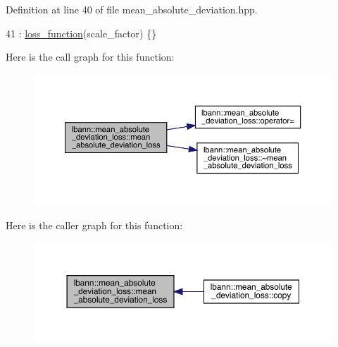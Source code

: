 Definition at line 40 of file mean\+\_\+absolute\+\_\+deviation.\+hpp.


\begin{DoxyCode}
41     : \hyperlink{classlbann_1_1loss__function_a0c5745e661c59e3e5496888d233c07cf}{loss\_function}(scale\_factor) \{\}
\end{DoxyCode}
Here is the call graph for this function\+:\nopagebreak
\begin{figure}[H]
\begin{center}
\leavevmode
\includegraphics[width=350pt]{classlbann_1_1mean__absolute__deviation__loss_ab729227237af711003b6cf4a9d9c9cf1_cgraph}
\end{center}
\end{figure}
Here is the caller graph for this function\+:\nopagebreak
\begin{figure}[H]
\begin{center}
\leavevmode
\includegraphics[width=350pt]{classlbann_1_1mean__absolute__deviation__loss_ab729227237af711003b6cf4a9d9c9cf1_icgraph}
\end{center}
\end{figure}
\mbox{\label{classlbann_1_1mean__absolute__deviation__loss_a590feaeb1fc096167655ff2fd0b9e9ae}} 
